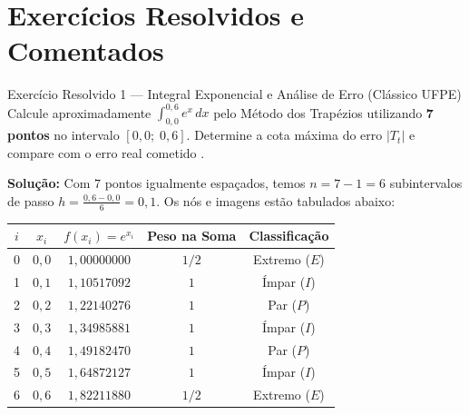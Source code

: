 \documentclass[11pt,a4paper]{article}
\begin{document}
\section{Exercícios Resolvidos e Comentados}

\begin{teobox}{Exercício Resolvido 1 --- Integral Exponencial e Análise de Erro (Clássico UFPE)}
Calcule aproximadamente $\int_{0,0}^{0,6} e^x\,dx$ pelo Método dos Trapézios utilizando \textbf{7 pontos} no intervalo $[0{,}0;\; 0{,}6]$. Determine a cota máxima do erro $|T_t|$ e compare com o erro real cometido \cite{santos2010, mesquita2026}.
\end{teobox}

\textbf{Solução:}
Com $7$ pontos igualmente espaçados, temos $n = 7 - 1 = 6$ subintervalos de passo $h = \frac{0{,}6 - 0{,}0}{6} = 0{,}1$. Os nós e imagens estão tabulados abaixo:

\begin{center}
\small
\begin{tabular}{ccccc}
\toprule
$i$ & $x_i$ & $f(x_i) = e^{x_i}$ & Peso na Soma & Classificação \\
\midrule
0 & $0{,}0$ & $1{,}00000000$ & $1/2$ & Extremo ($E$) \\
1 & $0{,}1$ & $1{,}10517092$ & $1$ & Ímpar ($I$) \\
2 & $0{,}2$ & $1{,}22140276$ & $1$ & Par ($P$) \\
3 & $0{,}3$ & $1{,}34985881$ & $1$ & Ímpar ($I$) \\
4 & $0{,}4$ & $1{,}49182470$ & $1$ & Par ($P$) \\
5 & $0{,}5$ & $1{,}64872127$ & $1$ & Ímpar ($I$) \\
6 & $0{,}6$ & $1{,}82211880$ & $1/2$ & Extremo ($E$) \\
\bottomrule
\end{tabular}
\end{center}
\end{document}
